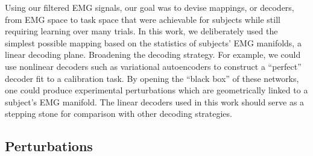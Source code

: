 \documentclass[../main.tex]{subfiles}
\begin{document}

Using our filtered EMG signals, our goal was to devise mappings, or decoders, from EMG space to task space that were achievable for subjects while still requiring learning over many trials. In this work, we deliberately used the simplest possible mapping based on the statistics of subjects' EMG manifolds, a linear decoding plane. Broadening the decoding strategy. For example, we could use nonlinear decoders such as variational autoencoders\cite{vujaklijaOnlineMappingEMG2018} to construct a ``perfect'' decoder fit to a calibration task. By opening the ``black box'' of these networks, one could produce experimental perturbations which are geometrically linked to a subject's EMG manifold. The linear decoders used in this work should serve as a stepping stone for comparison with other decoding strategies.



\subsection{Perturbations}
\end{document}
